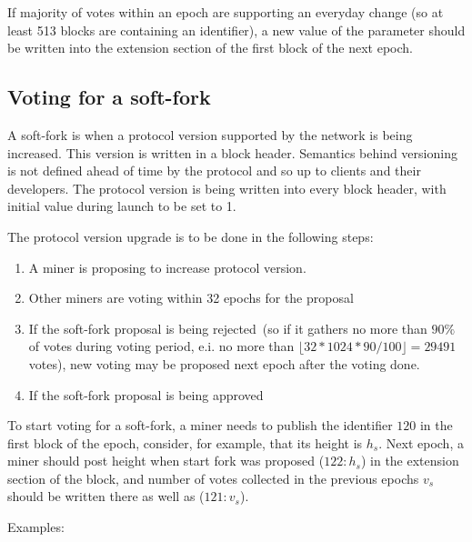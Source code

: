 If majority of votes within an epoch are supporting an everyday change (so at least 513 blocks are containing an
identifier), a new value of the parameter should be written into the extension section of the first block of the next
epoch.

\subsection{Voting for a soft-fork}

A soft-fork is when a protocol version supported by the network is being increased. This version is written in a block
header. Semantics behind versioning is not defined ahead of time by the protocol and so up to clients and their
developers. The protocol version is being written into every block header, with initial value during launch to be set
to 1.

The protocol version upgrade is to be done in the following steps:
\begin{enumerate}
    \item{} A miner is proposing to increase protocol version.
    \item{} Other miners are voting within 32 epochs for the proposal
    \item{} If the soft-fork proposal is being rejected~(so if it gathers no more than $90\%$ of votes during voting period, e.i.
            no more than $\lfloor 32 * 1024 * 90 / 100 \rfloor = 29491$ votes), new voting may be proposed next epoch
            after the voting done.
    \item{} If the soft-fork proposal is being approved
\end{enumerate}


To start voting for a soft-fork, a miner needs to publish the identifier $120$ in the first block of the epoch, consider,
for example, that its height is $h_s$. Next epoch, a miner should post height when start fork was proposed ($122: h_s$)
in the extension section of the block, and number of votes collected in the previous epochs $v_s$ should be written
there as well as ($121: v_s$).

Examples: